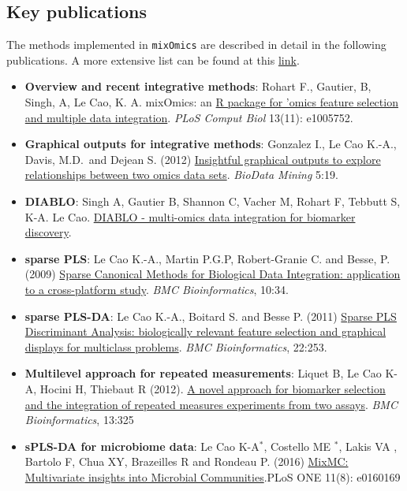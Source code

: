 \documentclass[]{book}
\begin{document}
\hypertarget{intro:pubs}{%
\subsection{Key publications}\label{intro:pubs}}

The methods implemented in \texttt{mixOmics} are described in detail in the following publications. A more extensive list can be found at this \href{http://mixomics.org/a-propos/publications/}{link}.

\begin{itemize}
\item
  \textbf{Overview and recent integrative methods}: Rohart F., Gautier, B, Singh, A, Le Cao, K. A. mixOmics: an \href{http://journals.plos.org/ploscompbiol/article?id=10.1371/journal.pcbi.1005752}{R package for 'omics feature selection and multiple data integration}. \emph{PLoS Comput Biol} 13(11): e1005752.
\item
  \textbf{Graphical outputs for integrative methods}: \citep{Gon12} Gonzalez I., Le Cao K.-A., Davis, M.D.~and Dejean S. (2012) \href{https://biodatamining.biomedcentral.com/articles/10.1186/1756-0381-5-19}{Insightful graphical outputs to explore relationships between two omics data sets}. \emph{BioData Mining} 5:19.
\item
  \textbf{DIABLO}: Singh A, Gautier B, Shannon C, Vacher M, Rohart F, Tebbutt S, K-A. Le Cao. \href{https://www.biorxiv.org/content/early/2018/03/20/067611}{DIABLO - multi-omics data integration for biomarker discovery}.
\item
  \textbf{sparse PLS}: Le Cao K.-A., Martin P.G.P, Robert-Granie C. and Besse, P. (2009) \href{http://www.biomedcentral.com/1471-2105/10/34/}{Sparse Canonical Methods for Biological Data Integration: application to a cross-platform study}. \emph{BMC Bioinformatics}, 10:34.
\item
  \textbf{sparse PLS-DA}: Le Cao K.-A., Boitard S. and Besse P. (2011) \href{https://bmcbioinformatics.biomedcentral.com/articles/10.1186/1471-2105-12-253}{Sparse PLS Discriminant Analysis: biologically relevant feature selection and graphical displays for multiclass problems}. \emph{BMC Bioinformatics}, 22:253.
\item
  \textbf{Multilevel approach for repeated measurements}: Liquet B, Le Cao K-A, Hocini H, Thiebaut R (2012). \href{https://bmcbioinformatics.biomedcentral.com/articles/10.1186/1471-2105-13-325}{A novel approach for biomarker selection and the integration of repeated measures experiments from two assays}. \emph{BMC Bioinformatics}, 13:325
\item
  \textbf{sPLS-DA for microbiome data}: Le Cao K-A\(^*\), Costello ME \(^*\), Lakis VA , Bartolo F, Chua XY, Brazeilles R and Rondeau P. (2016) \href{http://journals.plos.org/plosone/article?id=10.1371/journal.pone.0160169}{MixMC: Multivariate insights into Microbial Communities}.PLoS ONE 11(8): e0160169
\end{itemize}
\end{document}
